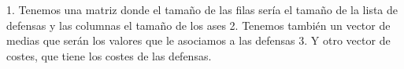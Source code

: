 1. Tenemos una matriz donde el tamaño de las filas sería el tamaño de la lista de defensas y las columnas el tamaño de los ases
2. Tenemos también un vector de medias que serán los valores que le asociamos a las defensas
3. Y otro vector de costes, que tiene los costes de las defensas.
